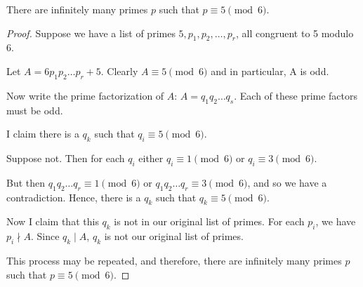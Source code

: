 \begin{prop}
    There are infinitely many primes $p$ such that $p \equiv 5 \pmod{6}$.
\end{prop}
\begin{proof}


Suppose we have a list of primes $5, p_1, p_2, \ldots, p_r$, all congruent to 5 modulo 6.

Let $A = 6 p_1 p_2 \ldots p_r + 5$. Clearly $A \equiv 5 \pmod{6}$ and in particular, A is odd.

Now write the prime factorization of $A$: $A = q_1 q_2 \ldots q_s$. Each of
these prime factors must be odd.

I claim there is a $q_k$ such that $q_i \equiv 5 \pmod{6}$. 

Suppose not. Then for each $q_i$ either $q_i \equiv 1 \pmod{6}$ or $q_i \equiv 3 \pmod{6}$. 

But then $q_1 q_2 \ldots q_r \equiv 1 \pmod{6}$ or $q_1 q_2 \ldots q_r \equiv 3
\pmod{6}$, and so we have a contradiction. Hence, there is a $q_k$ such that $q_k \equiv 5 \pmod{6}$.

Now I claim that this $q_k$ is not in our original list of primes. For each $p_i$, we have $p_i \nmid A$. Since $q_k \mid A$, $q_k$ is not our original list of primes.

This process may be repeated, and therefore, there are infinitely many primes $p$ such that $p \equiv 5 \pmod{6}$.
\end{proof}
